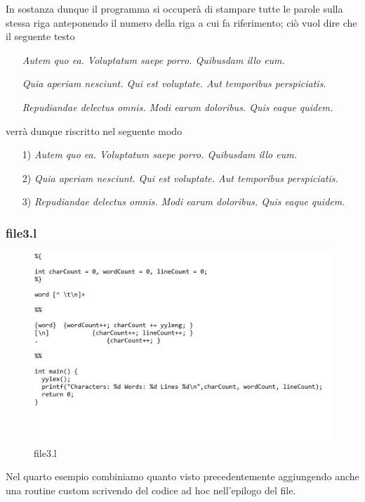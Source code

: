 \documentclass[class=book, crop=false, oneside, 12pt]{standalone}
\begin{document}
In sostanza dunque il programma si occuperà di stampare tutte le parole sulla stessa riga anteponendo il numero della riga a cui fa riferimento; ciò vuol dire che il seguente testo

\begin{itemize}
    \item[] \emph{Autem quo ea. Voluptatum saepe porro. Quibusdam illo eum.}

    \item[] \emph{Quia aperiam nesciunt. Qui est voluptate. Aut temporibus perspiciatis.}

    \item[] \emph{Repudiandae delectus omnis. Modi earum doloribus. Quis eaque quidem.}
\end{itemize}
verrà dunque riscritto nel seguente modo

\begin{enumerate}
    \item[1)] \emph{Autem quo ea. Voluptatum saepe porro. Quibusdam illo eum.}
    \item[2)] \emph{Quia aperiam nesciunt. Qui est voluptate. Aut temporibus perspiciatis.}
    \item[3)] \emph{Repudiandae delectus omnis. Modi earum doloribus. Quis eaque quidem.}
\end{enumerate}

\subsubsection{file3.l}

\begin{figure}[h]
    \centering
    \includegraphics[width=.7\textwidth,keepaspectratio]{file3.l.jpg}
    \caption{file3.l}
    \label{file3.l}
\end{figure}

Nel quarto esempio combiniamo quanto visto precedentemente aggiungendo anche una routine custom scrivendo del codice ad hoc nell'epilogo del file.
\end{document}
